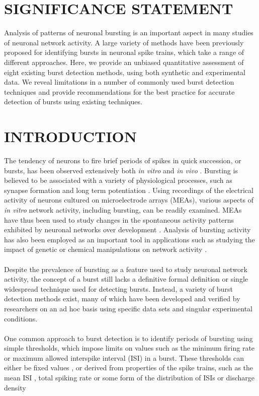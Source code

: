 \documentclass[12pt, titlepage]{article}
\begin{document}
	\section*{SIGNIFICANCE STATEMENT}
	Analysis of patterns of neuronal bursting is an important aspect in many studies of neuronal network activity. A large variety of methods have been previously proposed for identifying bursts in neuronal spike trains, which take a range of different approaches. Here, we provide an unbiased quantitative assessment of eight existing burst detection methods, using both synthetic and experimental data. We reveal limitations in a number of commonly used burst detection techniques and provide recommendations for the best practice for accurate detection of bursts using existing techniques. 
	\section*{INTRODUCTION}
	The tendency of neurons to fire brief periods of spikes in quick succession, or bursts, has been observed extensively both \textit{in vitro} and \textit{in vivo} \cite{Weyand2001,Pasquale2010}. Bursting is believed to be associated with a variety of physiological processes, such as synapse formation \cite{Maeda1995} and long term potentiation \cite{Lisman1997}. Using recordings of the electrical activity of neurons cultured on microelectrode arrays (MEAs), various aspects of \textit{in vitro} network activity, including bursting, can be readily examined. MEAs have thus been used to study changes in the spontaneous activity patterns exhibited by neuronal networks over development \cite{Wagenaar2006,Charlesworth2015}. Analysis of bursting activity has also been employed as an important tool in applications such as studying the impact of genetic or chemical manipulations on network activity \cite{Eisenman2015,Charlesworth2016}. 
	\\ \\ Despite the prevalence of bursting as a feature used to study neuronal network activity, the concept of a burst still lacks a definitive formal definition \cite{Cocatre-Zilgien1992} or single widespread technique used for detecting bursts. Instead, a variety of burst detection methods exist, many of which have been developed and verified by researchers on an ad hoc basis using specific data sets and singular experimental conditions. 
	\\\\One common approach to burst detection is to identify periods of bursting using simple thresholds, which impose limits on values such as the minimum firing rate or maximum allowed interspike interval (ISI) in a burst. These thresholds can either be fixed values  \cite{Chiappalone2005,Mukai2003},  or derived from properties of the spike trains, such as the mean ISI \cite{Chen2009}, total spiking rate \cite{Pimashkin2011} or some form of the distribution of ISIs or discharge density 
\end{document}
